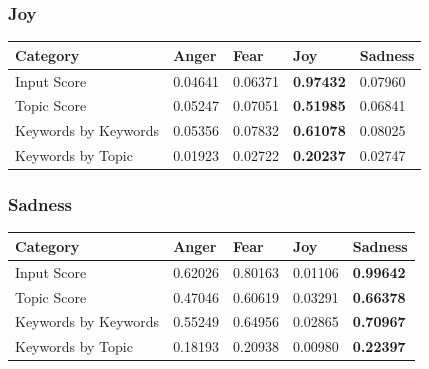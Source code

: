 \documentclass[11pt, twoside, reqno]{book}
\begin{document}
\subsubsection{\textbf{Joy}}

\begin{table}[h!]
    \raggedright
    \begin{tabular}{|l|l|l|l|l|}
    \hline
    Category & Anger & Fear & Joy & Sadness \\\hline
    Input Score & 0.04641 & 0.06371 & \textbf{0.97432} & 0.07960 \\\hline
    Topic Score & 0.05247 & 0.07051 & \textbf{0.51985} & 0.06841 \\\hline
    Keywords by Keywords & 0.05356 & 0.07832 & \textbf{0.61078} & 0.08025 \\\hline
    Keywords by Topic & 0.01923 & 0.02722 & \textbf{0.20237} & 0.02747 \\\hline
    \end{tabular}
\end{table}

\subsubsection{\textbf{Sadness}}

\begin{table}[h!]
    \raggedright
    \begin{tabular}{|l|l|l|l|l|}
    \hline
    Category & Anger & Fear & Joy & Sadness \\\hline
    Input Score & 0.62026 & 0.80163 & 0.01106 & \textbf{0.99642} \\\hline
    Topic Score & 0.47046 & 0.60619 & 0.03291 & \textbf{0.66378} \\\hline
    Keywords by Keywords & 0.55249 & 0.64956 & 0.02865 & \textbf{0.70967} \\\hline
    Keywords by Topic & 0.18193 & 0.20938 & 0.00980 & \textbf{0.22397} \\\hline
    \end{tabular}
\end{table}

\end{document}

